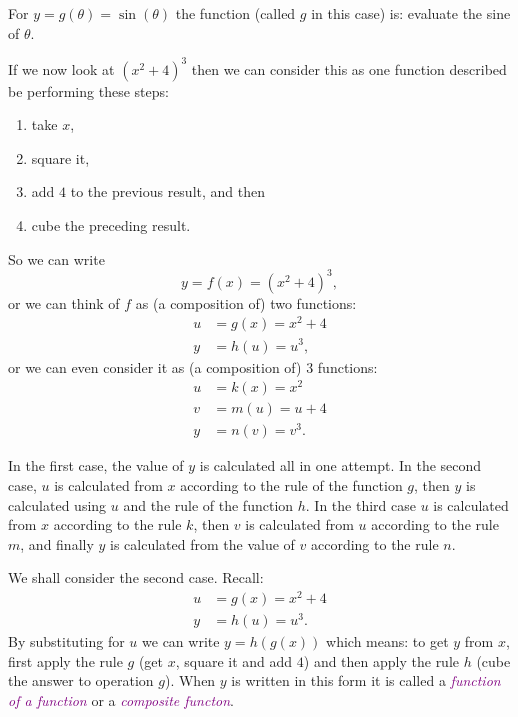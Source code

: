 \documentclass[
  english,
  11pt,
  oneside]{book}
\providecommand{\tightlist}{%
  \setlength{\itemsep}{0pt}\setlength{\parskip}{0pt}}
\newcommand{\slide}{}
\theoremstyle{definition}
\theoremstyle{definition}
\theoremstyle{definition}
\theoremstyle{definition}
\theoremstyle{remark}
\begin{document}
For \(y = g(\theta) = \sin(\theta)\) the function (called \(g\) in this case) is: evaluate the sine of \(\theta\).

If we now look at \((x^2 + 4)^3\) then we can consider this as one function described be performing these steps:

\begin{enumerate}
\def\labelenumi{\arabic{enumi}.}
\tightlist
\item
  take \(x\),
\item
  square it,
\item
  add \(4\) to the previous result, and then
\item
  cube the preceding result.
\end{enumerate}

\slide

So we can write
\[y = f(x) = (x^2+ 4)^3,\]
or we can think of \(f\) as (a composition of) two functions:
\begin{align*}
u &= g(x) = x^2 + 4\\
y &= h(u) = u^3,
\end{align*}
or we can even consider it as (a composition of) 3 functions:
\begin{align*}
u &= k(x) = x^2\\
v &= m(u) = u + 4\\
y &= n(v) = v^3.
\end{align*}
\slide
In the first case, the value of \(y\) is calculated all in one attempt. In the second case, \(u\) is calculated from \(x\) according to the rule of the function \(g\), then \(y\) is calculated using \(u\) and the rule of the function \(h\). In the third case \(u\) is calculated from \(x\) according to the rule \(k\), then \(v\) is calculated from \(u\) according to the rule \(m\), and finally \(y\) is calculated from the value of \(v\) according to the rule \(n\).

We shall consider the second case. Recall:
\begin{align*}
u &= g(x) = x^2+ 4\\
y &= h(u) = u^3.
\end{align*}
By substituting for \(u\) we can write \(y = h(g(x))\) which means: to get \(y\) from \(x\), first apply the rule \(g\) (get \(x\), square it and add \(4\)) and then apply the rule \(h\) (cube the answer to operation \(g\)). When \(y\) is written in this form it is called a \textcolor{purple}{\em function of a function} or a \textcolor{purple}{\em composite functon}.
\slide
\end{document}
